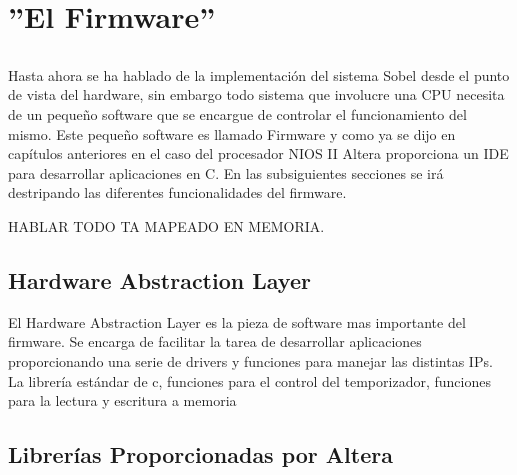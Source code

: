 \documentclass[a4paper,12pt,titlepage,final]{book}
\begin{document}




\chapter{''El Firmware''}
\section*{}
\subsection*{}
\subsubsection*{}

\paragraph{}
Hasta ahora se ha hablado de la implementación del sistema Sobel desde el punto de vista del hardware, sin embargo todo sistema que involucre una CPU necesita de un pequeño software que se encargue de controlar el funcionamiento del mismo. Este pequeño software es llamado Firmware y como ya se dijo en capítulos anteriores en el caso del procesador NIOS II Altera proporciona un IDE para desarrollar aplicaciones en C. En las subsiguientes secciones se irá destripando las diferentes funcionalidades del firmware.

HABLAR TODO TA MAPEADO EN MEMORIA.

\section{Hardware Abstraction Layer}
El Hardware Abstraction Layer es la pieza de software mas importante del firmware. Se encarga de facilitar la tarea de desarrollar aplicaciones proporcionando una serie de drivers y funciones para manejar las distintas IPs. La librería estándar de c, funciones para el control del temporizador, funciones para la lectura y escritura a memoria

\section{Librerías Proporcionadas por Altera}
\end{document}

